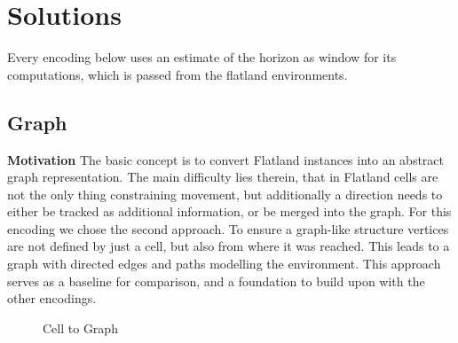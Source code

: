 
\section{Solutions}
Every encoding below uses an estimate of the horizon as window for its computations, which is passed from the flatland environments.

\subsection{Graph}
\noindent \textbf{Motivation} The basic concept is to convert Flatland instances into an abstract graph representation. The main difficulty lies therein, that in Flatland cells are not the only thing constraining movement, but additionally a direction needs to either be tracked as additional information, or be merged into the graph. For this encoding we chose the second approach. To ensure a graph-like structure vertices are not defined by just a cell, but also from where it was reached. This leads to a graph with directed edges and paths modelling the environment. This approach serves as a baseline for comparison, and a foundation to build upon with the other encodings.\\

\begin{figure}
\begin{minipage}[t]{0.45\textwidth}
    \centering
    \caption{Cell to Graph}
    \label{fig:graph}
\end{minipage}
\end{figure}

